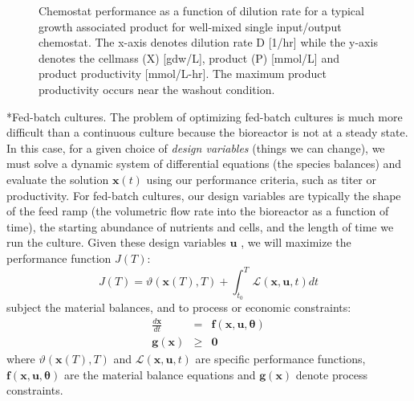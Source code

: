 \documentclass[11pt]{article}
\makeatletter
\theoremstyle{definition}
\renewcommand\subsubsection{\@startsection
	{subsubsection}{2}{0mm}
	{-0.05in}
	{-0.5\baselineskip}
	{\normalfont\normalsize\itshape}}
\makeatother
\begin{document}
\begin{figure*}[!ht]\centering
{}
\caption{Chemostat performance as a function of dilution rate for a typical growth associated product for well-mixed single input/output chemostat.
The x-axis denotes dilution rate D [1/hr] while the y-axis denotes the cellmass (X) [gdw/L], product (P) [mmol/L] and product productivity [mmol/L-hr].
The maximum product productivity occurs near the washout condition.}\label{fig-productivity-chemostat}
\end{figure*}


\subsubsection*{Fed-batch cultures.}
The problem of optimizing fed-batch cultures is much more difficult than a continuous culture because the bioreactor is not at a steady state.
In this case, for a given choice of \textit{design variables} (things we can change),
we must solve a dynamic system of differential equations (the species balances) and evaluate the solution $\mathbf{x}(t)$ using
our performance criteria, such as titer or productivity. For fed-batch cultures, our design variables are typically the shape of the feed ramp (the volumetric flow rate into
the bioreactor as a function of time), the starting abundance of nutrients and cells, and the length of time we run the culture. Given these design variables $\mathbf{u}$ , we will maximize the performance function $J\left(T\right)$:
\begin{equation}\label{eqn-generic-obj-function}
J\left(T\right) = \vartheta\left(\mathbf{x}\left(T\right),T\right) + \int_{t_{0}}^{T}\mathcal{L}\left(\mathbf{x},\mathbf{u},t\right)dt
\end{equation}subject the material balances, and to process or economic constraints:
\begin{eqnarray}\label{eqn-generic-constraints}
		\frac{d\mathbf{x}}{dt} &=& \mathbf{f}\left(\mathbf{x},\mathbf{u},\mathbf{\theta}\right)\\
	\mathbf{g}\left(\mathbf{x}\right)&\geq&\mathbf{0}
\end{eqnarray}
where $\vartheta\left(\mathbf{x}\left(T\right),T\right)$ and $\mathcal{L}\left(\mathbf{x},\mathbf{u},t\right)$ are specific performance functions, $\mathbf{f}\left(\mathbf{x},\mathbf{u},\mathbf{\theta}\right)$ are the material balance equations and $\mathbf{g}\left(\mathbf{x}\right)$ denote process constraints.
\end{document}
